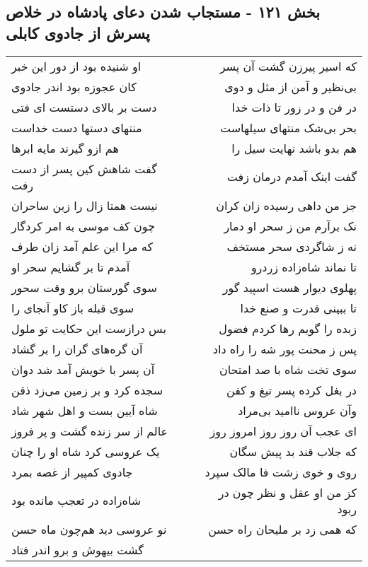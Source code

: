 \begin{center}
\section*{بخش ۱۲۱ - مستجاب شدن دعای پادشاه در خلاص پسرش از جادوی کابلی}
\label{sec:sh121}
\begin{longtable}{l p{0.5cm} r}
او شنیده بود از دور این خبر
&&
که اسیر پیرزن گشت آن پسر
\\
کان عجوزه بود اندر جادوی
&&
بی‌نظیر و آمن از مثل و دوی
\\
دست بر بالای دستست ای فتی
&&
در فن و در زور تا ذات خدا
\\
منتهای دستها دست خداست
&&
بحر بی‌شک منتهای سیلهاست
\\
هم ازو گیرند مایه ابرها
&&
هم بدو باشد نهایت سیل را
\\
گفت شاهش کین پسر از دست رفت
&&
گفت اینک آمدم درمان زفت
\\
نیست همتا زال را زین ساحران
&&
جز من داهی رسیده زان کران
\\
چون کف موسی به امر کردگار
&&
نک برآرم من ز سحر او دمار
\\
که مرا این علم آمد زان طرف
&&
نه ز شاگردی سحر مستخف
\\
آمدم تا بر گشایم سحر او
&&
تا نماند شاه‌زاده زردرو
\\
سوی گورستان برو وقت سحور
&&
پهلوی دیوار هست اسپید گور
\\
سوی قبله باز کاو آنجای را
&&
تا ببینی قدرت و صنع خدا
\\
بس درازست این حکایت تو ملول
&&
زبده را گویم رها کردم فضول
\\
آن گره‌های گران را بر گشاد
&&
پس ز محنت پور شه را راه داد
\\
آن پسر با خویش آمد شد دوان
&&
سوی تخت شاه با صد امتحان
\\
سجده کرد و بر زمین می‌زد ذقن
&&
در بغل کرده پسر تیغ و کفن
\\
شاه آیین بست و اهل شهر شاد
&&
وآن عروس ناامید بی‌مراد
\\
عالم از سر زنده گشت و پر فروز
&&
ای عجب آن روز روز امروز روز
\\
یک عروسی کرد شاه او را چنان
&&
که جلاب قند بد پیش سگان
\\
جادوی کمپیر از غصه بمرد
&&
روی و خوی زشت فا مالک سپرد
\\
شاه‌زاده در تعجب مانده بود
&&
کز من او عقل و نظر چون در ربود
\\
نو عروسی دید هم‌چون ماه حسن
&&
که همی زد بر ملیحان راه حسن
\\
گشت بیهوش و برو اندر فتاد

\end{longtable}
\end{center}
